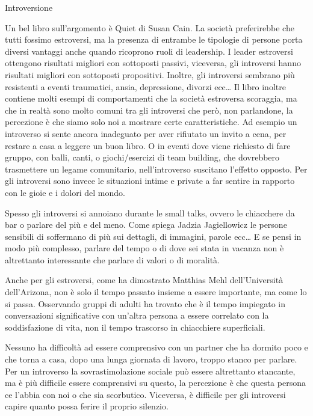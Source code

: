 \documentclass[12pt]{book} %
\begin{document}
\begin{mdframed}[linewidth=1pt]
Introversione

Un bel libro sull'argomento è Quiet di Susan Cain.
La società preferirebbe che tutti fossimo estroversi, ma la presenza di entrambe le tipologie di persone porta diversi
vantaggi anche quando ricoprono ruoli di leadership. I leader estroversi ottengono risultati migliori con sottoposti
passivi, viceversa, gli introversi hanno risultati migliori con sottoposti propositivi. Inoltre, gli introversi
sembrano più resistenti a eventi traumatici, ansia, depressione, divorzi ecc… Il libro inoltre contiene molti esempi di
comportamenti che la società estroversa scoraggia, ma che in realtà sono molto comuni tra gli introversi che però, non
parlandone, la percezione è che siamo solo noi a mostrare certe caratteristiche. Ad esempio un introverso si sente
ancora inadeguato per aver rifiutato un invito a cena, per restare a casa a leggere un buon libro. O in eventi dove
viene richiesto di fare gruppo, con balli, canti, o giochi/esercizi di team building, che dovrebbero trasmettere un
legame comunitario, nell'introverso suscitano l'effetto opposto. Per gli
introversi sono invece le situazioni intime e private a far sentire in rapporto con le gioie e i dolori del mondo.

Spesso gli introversi si annoiano durante le small talks, ovvero le chiacchere da bar o parlare del più e del meno. Come
spiega Jadzia Jagiellowicz le persone sensibili di soffermano di più sui dettagli, di immagini, parole ecc… E se pensi
in modo più complesso, parlare del tempo o di dove sei stata in vacanza non è altrettanto interessante che parlare di
valori o di moralità.

Anche per gli estroversi, come ha dimostrato Matthias Mehl dell'Università dell'Arizona, non è solo il tempo passato
insieme a essere importante, ma come lo si passa. Osservando gruppi di adulti ha trovato che è il tempo impiegato in
conversazioni significative con un'altra persona a essere correlato con la soddisfazione di vita, non il tempo
trascorso in chiacchiere superficiali. 

Nessuno ha difficoltà ad essere comprensivo con un partner che ha dormito poco e che torna a casa, dopo una lunga
giornata di lavoro, troppo stanco per parlare. Per un introverso la sovrastimolazione sociale può essere altrettanto
stancante, ma è più difficile essere comprensivi su questo, la percezione è che questa persona ce
l'abbia con noi o che sia scorbutico. Viceversa, è difficile per gli introversi capire quanto
possa ferire il proprio silenzio. 


\end{mdframed}
\end{document}
